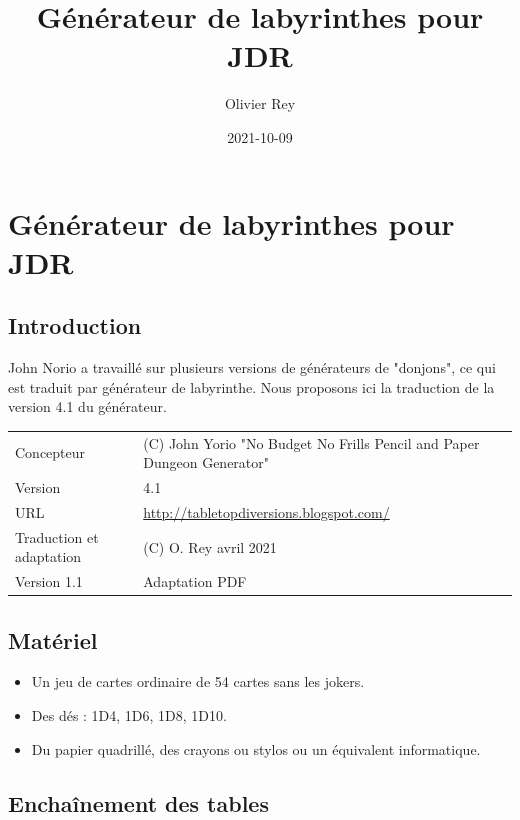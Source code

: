 \documentclass[a4paper, 11pt, twoside]{article}
\author{Olivier Rey}
\date{2021-10-09}
\title{Générateur de labyrinthes pour JDR}
\begin{document}
\maketitle
\tableofcontents

\newpage

\section{Générateur de labyrinthes pour JDR}
\label{sec:orgcc9f3fe}

\subsection{Introduction}
\label{sec:org700493e}

John Norio a travaillé sur plusieurs versions de générateurs de "donjons", ce qui est traduit par générateur de labyrinthe. Nous proposons ici la traduction de la version 4.1 du générateur.

\begin{longtable}{ll}
Concepteur & (C) John Yorio "No Budget No Frills Pencil and Paper Dungeon Generator"\\
Version & 4.1\\
URL & \href{http://tabletopdiversions.blogspot.com/2012/12/dungeon-generator-updated-now-with-more.html}{http://tabletopdiversions.blogspot.com/}\\
Traduction et adaptation & (C) O. Rey avril 2021\\
Version 1.1 & Adaptation PDF\\
\end{longtable}

\subsection{Matériel}
\label{sec:orgc648b18}

\begin{itemize}
\item Un jeu de cartes ordinaire de 54 cartes sans les jokers.
\item Des dés : 1D4, 1D6, 1D8, 1D10.
\item Du papier quadrillé, des crayons ou stylos ou un équivalent informatique.
\end{itemize}

\subsection{Enchaînement des tables}
\label{sec:org4f27e1a}
\end{document}
